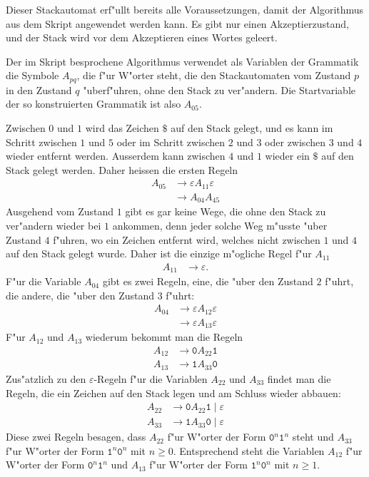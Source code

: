\begin{loesung}
Dieser Stackautomat erf"ullt bereits alle Voraussetzungen, damit
der Algorithmus aus dem Skript angewendet werden kann. Es gibt nur
einen Akzeptierzustand, und der Stack wird vor dem Akzeptieren
eines Wortes geleert.

Der im Skript besprochene Algorithmus verwendet als Variablen der
Grammatik die Symbole $A_{pq}$, die f"ur W"orter steht, die den
Stackautomaten vom Zustand $p$ in den Zustand $q$ "uberf"uhren, ohne
den Stack zu ver"andern. Die Startvariable der so konstruierten Grammatik
ist also $A_{05}$.

Zwischen $0$ und $1$ wird das Zeichen $\texttt{\$}$ auf den Stack gelegt,
und es kann im Schritt zwischen $1$ und $5$ oder im Schritt zwischen $2$
und $3$ oder zwischen $3$ und $4$ wieder entfernt werden. Ausserdem
kann zwischen $4$ und $1$ wieder ein $\texttt{\$}$ auf den Stack gelegt
werden. Daher heissen die ersten Regeln
\begin{align*}
A_{05}&\to \varepsilon A_{11}\varepsilon \\
      &\to A_{04}A_{45}
\end{align*}
Ausgehend vom Zustand $1$ gibt es gar keine Wege, die ohne den Stack zu
ver"andern wieder bei $1$ ankommen, denn jeder solche Weg m"usste "uber
Zustand $4$ f"uhren, wo ein Zeichen entfernt wird, welches nicht zwischen
$1$ und $4$ auf den Stack gelegt wurde. Daher ist die einzige m"ogliche
Regel f"ur $A_{11}$
\begin{align*}
A_{11}&\to\varepsilon.
\end{align*}
F"ur die Variable $A_{04}$ gibt es zwei Regeln, eine, die "uber den
Zustand $2$ f"uhrt, die andere, die "uber den Zustand $3$ f"uhrt:
\begin{align*}
A_{04}&\to \varepsilon A_{12}\varepsilon\\
      &\to \varepsilon A_{13}\varepsilon
\end{align*}
F"ur $A_{12}$ und $A_{13}$ wiederum bekommt man die Regeln
\begin{align*}
A_{12}&\to\texttt{0} A_{22}\texttt{1}\\
A_{13}&\to\texttt{1} A_{33}\texttt{0}
\end{align*}
Zus"atzlich zu den $\varepsilon$-Regeln f"ur die Variablen $A_{22}$ und $A_{33}$
findet man die Regeln, die ein Zeichen auf den Stack legen und am
Schluss wieder abbauen:
\begin{align*}
A_{22}&\to \texttt{0}A_{22}\texttt{1}\;|\;\varepsilon\\
A_{33}&\to \texttt{1}A_{33}\texttt{0}\;|\;\varepsilon
\end{align*}
Diese zwei Regeln besagen, dass $A_{22}$ f"ur W"orter der Form
$\texttt{0}^n\texttt{1}^n$ steht und $A_{33}$ f"ur W"orter der Form
$\texttt{1}^n\texttt{0}^n$ mit $n\ge 0$.
Entsprechend steht die Variablen $A_{12}$  f"ur W"orter der Form
$\texttt{0}^n\texttt{1}^n$ und $A_{13}$ f"ur W"orter der Form
$\texttt{1}^n\texttt{0}^n$ mit $n\ge 1$.


\end{loesung}
